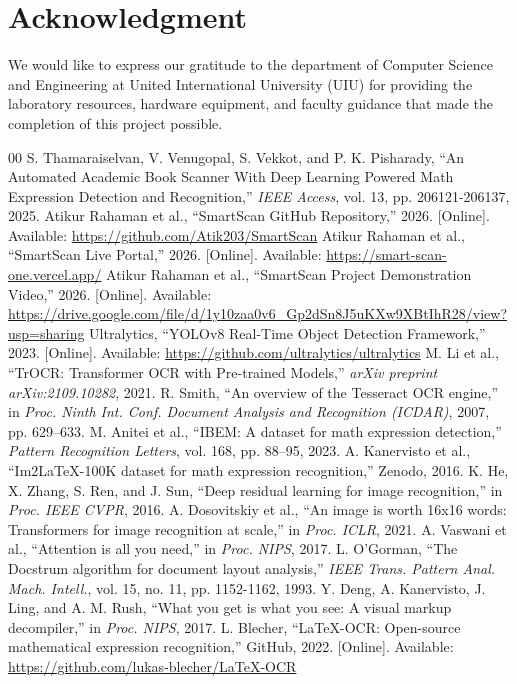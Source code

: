 \documentclass[conference]{IEEEtran}
\begin{document}
\section*{Acknowledgment}

We would like to express our gratitude to the department of Computer Science and Engineering at United International University (UIU) for providing the laboratory resources, hardware equipment, and faculty guidance that made the completion of this project possible.

\balance
\begin{thebibliography}{00}
 S. Thamaraiselvan, V. Venugopal, S. Vekkot, and P. K. Pisharady, ``An Automated Academic Book Scanner With Deep Learning Powered Math Expression Detection and Recognition,'' \textit{IEEE Access}, vol. 13, pp. 206121-206137, 2025.
 Atikur Rahaman et al., ``SmartScan GitHub Repository,'' 2026. [Online]. Available: \url{https://github.com/Atik203/SmartScan}
 Atikur Rahaman et al., ``SmartScan Live Portal,'' 2026. [Online]. Available: \url{https://smart-scan-one.vercel.app/}
 Atikur Rahaman et al., ``SmartScan Project Demonstration Video,'' 2026. [Online]. Available: \url{https://drive.google.com/file/d/1y10zaa0v6_Gp2dSn8J5uKXw9XBtIhR28/view?usp=sharing}
 Ultralytics, ``YOLOv8 Real-Time Object Detection Framework,'' 2023. [Online]. Available: \url{https://github.com/ultralytics/ultralytics}
 M. Li et al., ``TrOCR: Transformer OCR with Pre-trained Models,'' \textit{arXiv preprint arXiv:2109.10282}, 2021.
 R. Smith, ``An overview of the Tesseract OCR engine,'' in \textit{Proc. Ninth Int. Conf. Document Analysis and Recognition (ICDAR)}, 2007, pp. 629–633.
 M. Anitei et al., ``IBEM: A dataset for math expression detection,'' \textit{Pattern Recognition Letters}, vol. 168, pp. 88–95, 2023.
 A. Kanervisto et al., ``Im2LaTeX-100K dataset for math expression recognition,'' Zenodo, 2016.
 K. He, X. Zhang, S. Ren, and J. Sun, ``Deep residual learning for image recognition,'' in \textit{Proc. IEEE CVPR}, 2016.
 A. Dosovitskiy et al., ``An image is worth 16x16 words: Transformers for image recognition at scale,'' in \textit{Proc. ICLR}, 2021.
 A. Vaswani et al., ``Attention is all you need,'' in \textit{Proc. NIPS}, 2017.
 L. O'Gorman, ``The Docstrum algorithm for document layout analysis,'' \textit{IEEE Trans. Pattern Anal. Mach. Intell.}, vol. 15, no. 11, pp. 1152-1162, 1993.
 Y. Deng, A. Kanervisto, J. Ling, and A. M. Rush, ``What you get is what you see: A visual markup decompiler,'' in \textit{Proc. NIPS}, 2017.
 L. Blecher, ``LaTeX-OCR: Open-source mathematical expression recognition,'' GitHub, 2022. [Online]. Available: \url{https://github.com/lukas-blecher/LaTeX-OCR}
\end{thebibliography}
\end{document}
